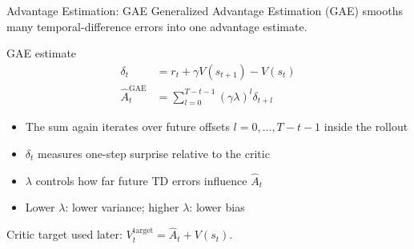 \documentclass[aspectratio=169, 11pt]{beamer}
\begin{document}
\begin{frame}{Advantage Estimation: GAE}
  Generalized Advantage Estimation (GAE) smooths many temporal-difference errors
  into one advantage estimate.

  \vspace{0.5em}
  \begin{block}{GAE estimate}
    \begin{align*}
      \delta_t &= r_t + \gamma V(s_{t+1}) - V(s_t) \\
      \hat{A}_t^{\mathrm{GAE}}
      &= \sum_{l=0}^{T-t-1} (\gamma\lambda)^l \delta_{t+l}
    \end{align*}
  \end{block}

  \begin{itemize}
    \item The sum again iterates over future offsets
          $l=0,\ldots,T-t-1$ inside the rollout
    \item $\delta_t$ measures one-step surprise relative to the critic
    \item $\lambda$ controls how far future TD errors influence $\hat{A}_t$
    \item Lower $\lambda$: lower variance; higher $\lambda$: lower bias
  \end{itemize}

  \vspace{0.2em}
  \centering
  \footnotesize Critic target used later: $V_t^{\mathrm{target}}=\hat{A}_t+V(s_t)$.
\end{frame}
\end{document}
